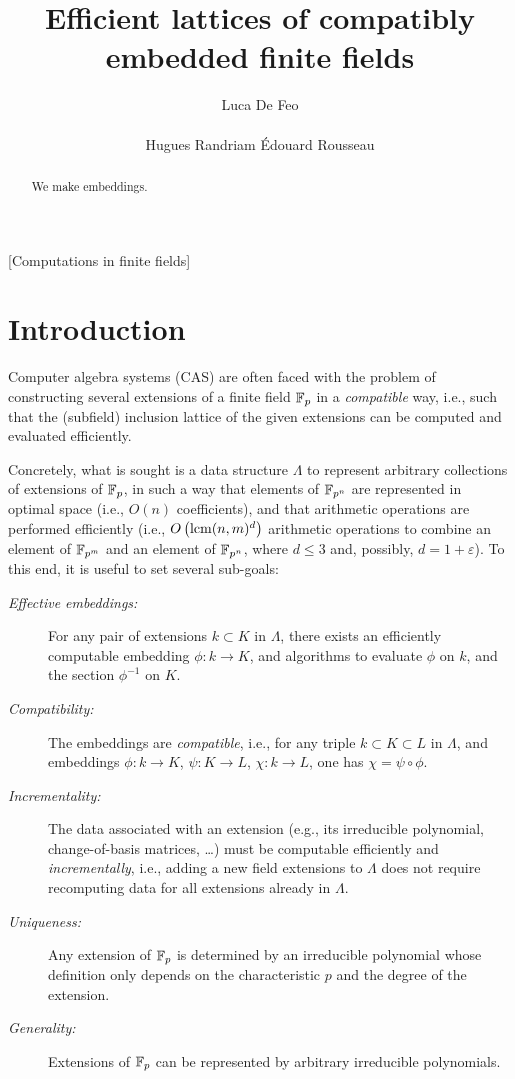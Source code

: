 \documentclass{sig-alternate}
\author{
  \alignauthor Luca De Feo\\
  \affaddr{Universit\'e Paris Saclay -- UVSQ, LMV}\\
  \email{luca.de-feo@uvsq.fr}
  \alignauthor Hugues Randriam
  \alignauthor \'Edouard Rousseau
}
\title{Efficient lattices of compatibly embedded finite fields}
\begin{document}
\maketitle

\begin{abstract}
  We make embeddings.
\end{abstract}

[Computations in finite fields]

\section{Introduction}
\label{sec:introduction}

Computer algebra systems (CAS) are often faced with the problem of
constructing several extensions of a finite field $\mathbb{F}_p$ in a
\emph{compatible} way, i.e., such that the (subfield) inclusion
lattice of the given extensions can be computed and evaluated
efficiently.

Concretely, what is sought is a data structure $\Lambda$ to represent
arbitrary collections of extensions of $\mathbb{F}_p$, in such a way that
elements of $\mathbb{F}_{p^n}$ are represented in optimal space (i.e., $O(n)$
coefficients), and that arithmetic operations are performed
efficiently (i.e., $O\left(\operatorname{lcm}(n,m)^d\right)$ arithmetic operations
to combine an element of $\mathbb{F}_{p^m}$ and an element of $\mathbb{F}_{p^n}$,
where $d\le 3$ and, possibly, $d=1+\varepsilon$). %
To this end, it is useful to set several sub-goals:

\begin{description}
\item[\emph{Effective embeddings:}] For any pair of extensions
  $k\subset K$ in $\Lambda$, there exists an efficiently computable
  embedding $\phi:k\to K$, and algorithms to evaluate $\phi$ on $k$,
  and the section $\phi^{-1}$ on $K$.
\item[\emph{Compatibility:}] The embeddings are \emph{compatible},
  i.e., for any triple $k\subset K\subset L$ in $\Lambda$, and
  embeddings $\phi:k\to K$, $\psi:K\to L$, $\chi:k\to L$, one has
  $\chi=\psi\circ\phi$.
\item[\emph{Incrementality:}] The data associated with an extension
  (e.g., its irreducible polynomial, change-of-basis matrices, \dots)
  must be computable efficiently and \emph{incrementally}, i.e.,
  adding a new field extensions to $\Lambda$ does not require
  recomputing data for all extensions already in $\Lambda$. %
\item[\emph{Uniqueness:}] Any extension of $\mathbb{F}_p$ is determined by an
  irreducible polynomial whose definition only depends on the
  characteristic $p$ and the degree of the extension. %
\item[\emph{Generality:}] Extensions of $\mathbb{F}_p$ can be represented by
  arbitrary irreducible polynomials.
\end{description}
\end{document}
